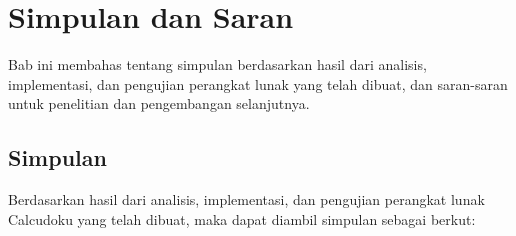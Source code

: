 \chapter{Simpulan dan Saran}
\label{chap:simpulansaran}

Bab ini membahas tentang simpulan berdasarkan hasil dari analisis, implementasi, dan pengujian perangkat lunak yang telah dibuat, dan saran-saran untuk penelitian dan pengembangan selanjutnya.

\section{Simpulan}
\label{sec:simpulan}

Berdasarkan hasil dari analisis, implementasi, dan pengujian perangkat lunak Calcudoku yang telah dibuat, maka dapat diambil simpulan sebagai berkut:

